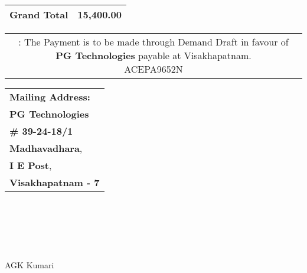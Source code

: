 \documentclass[11pt]{article}
\begin{document}
\vspace*{0.45cm}

\hspace*{12.3cm}
\begin{tabular}{|c|r|}
\hline
{\bf Grand Total} & 15,400.00 \\
\hline
\end{tabular}

\vspace*{-0.45cm}
\hspace*{-0.4cm}
\begin{tabular}{c}
\parbox{4in}{ : The Payment is to be made through Demand Draft in favour of {\bf PG Technologies} payable at Visakhapatnam. \\
 ACEPA9652N}\\
\end{tabular}
\vspace*{35pt}

\hspace{-0.4cm} \begin{tabular}{l}
{\bf Mailing Address:}\\
{\bf PG Technologies}\\
{\bf \# 39-24-18/1}\\
{\bf Madhavadhara}, \\ 
{\bf I E Post}, \\
{\bf Visakhapatnam - 7}\\
\end{tabular}

\vspace*{45pt}
\hspace*{-0.1cm}{\bf For  PG Technologies } \\ \\ \\ \\ \\
\hspace*{.5cm}AGK Kumari
\end{document}
